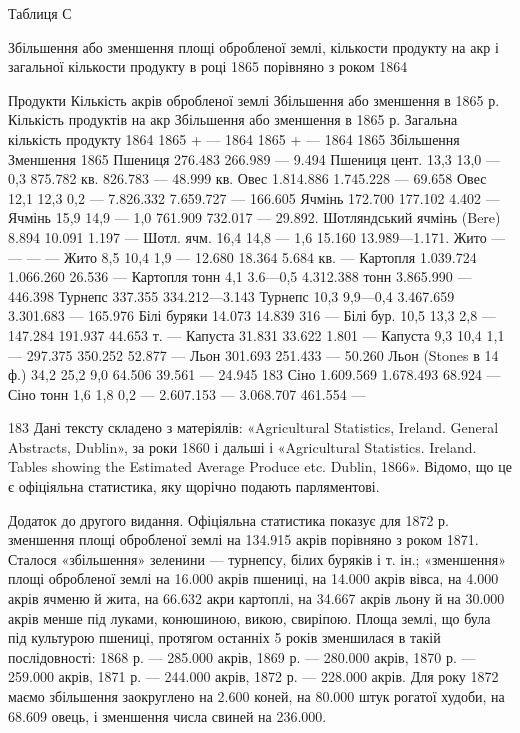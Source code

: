 Таблиця С

Збільшення або зменшення площі обробленої землі, кількости продукту на акр і загальної кількости
продукту в році 1865 порівняно з роком 1864

Продукти    Кількість акрів обробленої землі        Збільшення або зменшення в 1865 р. Кількість
продуктів на акр            Збільшення або зменшення в 1865 р. Загальна кількість продукту
    1864    1865 + — 1864        1865 + — 1864        1865    Збільшення    Зменшення 1865
Пшениця             276.483           266.989  — 9.494
Пшениця цент.    13,3    13,0 — 0,3    875.782    кв.    826.783    —   48.999 кв.
Овес                              1.814.886       1.745.228   —   69.658
Овес    12,1    12,3    0,2  —   7.826.332   7.659.727   —   166.605
Ячмінь                           172.700           177.102             4.402 —
Ячмінь     15,9    14,9    —   1,0    761.909        732.017  —  29.892.
Шотляндський ячмінь (Bere)    8.894    10.091    1.197   —
Шотл. ячм. 16,4    14,8  —  1,6    15.160        13.989—1.171.
Жито    —    —    —     —
Жито 8,5    10,4    1,9   —   12.680 18.364    5.684 кв. —
Картопля       1.039.724      1.066.260            26.536 —
Картопля тонн    4,1    3.6—0,5    4.312.388   тонн    3.865.990    —    446.398
Турнепс                      337.355    334.212—3.143
Турнепс 10,3    9,9—0,4    3.467.659        3.301.683     —     165.976
Білі буряки 14.073    14.839    316        —
Білі бур. 10,5    13,3    2,8     —     147.284     191.937    44.653 т.     —
Капуста        31.831    33.622    1.801 —
Капуста    9,3    10,4    1,1    —     297.375        350.252    52.877 —
Льон        301.693    251.433       —      50.260
Льон (Stones в 14 ф.) 34,2        25,2            9,0    64.506        39.561    —  24.945 183
Сіно        1.609.569    1.678.493    68.924      —
Сіно тонн    1,6    1,8    0,2   —  2.607.153   —  3.068.707    461.554   —

183    Дані тексту складено з матеріялів: «Agricultural Statistics, Ireland. General Abstracts,
Dublin», за роки 1860 і дальші і «Agricultural Statistics. Ireland. Tables showing the Estimated
Average Produce etc. Dublin, 1866».
Відомо, що це є офіціяльна статистика, яку щорічно подають парляментові.

Додаток до другого видання. Офіціяльна статистика показує для 1872 р. зменшення площі обробленої
землі на 134.915 акрів порівняно з роком 1871. Сталося «збільшення» зеленини — турнепсу, білих
буряків і т. ін.; «зменшення» площі обробленої землі на 16.000 акрів пшениці, на 14.000 акрів вівса,
на 4.000 акрів ячменю й жита, на 66.632 акри картоплі, на 34.667 акрів льону й на 30.000 акрів менше
під луками, конюшиною, викою, свиріпою. Площа землі, що була під культурою пшениці, протягом
останніх 5 років зменшилася в такій послідовності: 1868 р. — 285.000 акрів, 1869 р. — 280.000 акрів,
1870 р. — 259.000 акрів, 1871 р. — 244.000 акрів, 1872 р. — 228.000 акрів. Для року 1872 маємо
збільшення заокруглено на 2.600 коней, на 80.000 штук рогатої худоби, на 68.609 овець, і зменшення
числа свиней на 236.000.
